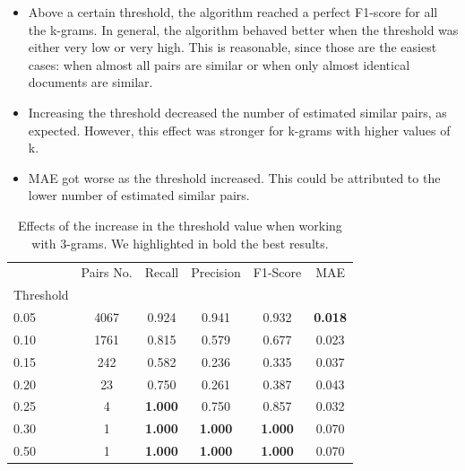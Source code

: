 \documentclass[runningheads]{llncs}
\begin{document}
\begin{itemize}
  \item Above a certain threshold, the algorithm reached a perfect F1-score for all the k-grams. In general, the algorithm behaved better when the threshold was either very low or very high. This is reasonable, since those are the easiest cases: when almost all pairs are similar or when only almost identical documents are similar.
  \item Increasing the threshold decreased the number of estimated similar pairs, as expected. However, this effect was stronger for k-grams with higher values of k.
  \item MAE got worse as the threshold increased. This could be attributed to the lower number of estimated similar pairs. 
\end{itemize}

\begin{table}
  \caption{Effects of the increase in the threshold value when working with 3-grams. We highlighted in bold the best results.}
  \label{tab:experiments:threshold_k3}
  \centering
  \begin{tabular}{lccccc}
    \toprule
    {} &  Pairs No. &  Recall &  Precision &  F1-Score &    MAE \\
    Threshold &            &         &            &           &        \\
    \midrule
    0.05      &       4067 &   0.924 &      0.941 &     0.932 &  \textbf{0.018} \\
    0.10      &       1761 &   0.815 &      0.579 &     0.677 &  0.023 \\
    0.15      &        242 &   0.582 &      0.236 &     0.335 &  0.037 \\
    0.20      &         23 &   0.750 &      0.261 &     0.387 &  0.043 \\
    0.25      &          4 &   \textbf{1.000} &      0.750 &     0.857 &  0.032 \\
    0.30      &          1 &   \textbf{1.000} &      \textbf{1.000} &     \textbf{1.000} &  0.070 \\
    0.50      &          1 &   \textbf{1.000} &      \textbf{1.000} &     \textbf{1.000} &  0.070 \\
    \bottomrule
    \end{tabular}
\end{table}
\end{document}
